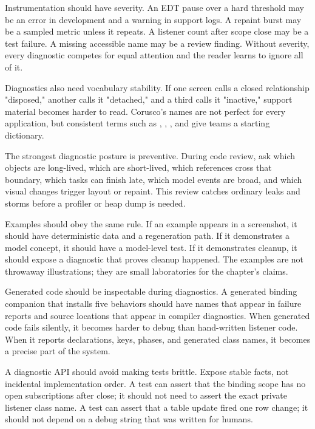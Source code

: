 Instrumentation should have severity. An EDT pause over a hard threshold may be an error in development and a warning in support logs. A repaint burst may be a sampled metric unless it repeats. A listener count after scope close may be a test failure. A missing accessible name may be a review finding. Without severity, every diagnostic competes for equal attention and the reader learns to ignore all of it.

Diagnostics also need vocabulary stability. If one screen calls a closed relationship "disposed," another calls it "detached," and a third calls it "inactive," support material becomes harder to read. Corusco's names are not perfect for every application, but consistent terms such as , , , and  give teams a starting dictionary.

The strongest diagnostic posture is preventive. During code review, ask which objects are long-lived, which are short-lived, which references cross that boundary, which tasks can finish late, which model events are broad, and which visual changes trigger layout or repaint. This review catches ordinary leaks and storms before a profiler or heap dump is needed.

Examples should obey the same rule. If an example appears in a screenshot, it should have deterministic data and a regeneration path. If it demonstrates a model concept, it should have a model-level test. If it demonstrates cleanup, it should expose a diagnostic that proves cleanup happened. The examples are not throwaway illustrations; they are small laboratories for the chapter's claims.

Generated code should be inspectable during diagnostics. A generated binding companion that installs five behaviors should have names that appear in failure reports and source locations that appear in compiler diagnostics. When generated code fails silently, it becomes harder to debug than hand-written listener code. When it reports declarations, keys, phases, and generated class names, it becomes a precise part of the system.

A diagnostic API should avoid making tests brittle. Expose stable facts, not incidental implementation order. A test can assert that the binding scope has no open subscriptions after close; it should not need to assert the exact private listener class name. A test can assert that a table update fired one row change; it should not depend on a debug string that was written for humans.

